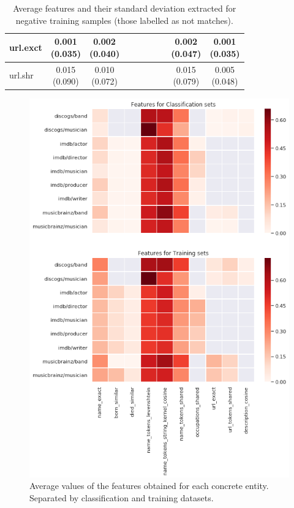 \documentclass[epsfig,a4paper,11pt,titlepage,twoside,openany]{book}
\begin{document}
\begin{table}[h]
\begin{tabular}{l|c|c|c|c|c|c|c|c|c|}
\multicolumn{1}{|l|}{url.exct}                           & \makecell{0.001 \\ (0.035)}  & \makecell{0.002 \\ (0.040)} &              &              &              &              &              & \makecell{0.002 \\ (0.047)}    & \makecell{0.001 \\ (0.035)}   \\ \hline
\multicolumn{1}{|l|}{url.shr}                  & \makecell{0.015 \\ (0.090)}  & \makecell{0.010 \\ (0.072)} &              &              &              &              &              & \makecell{0.015 \\ (0.079)}    & \makecell{0.005 \\ (0.048)}   \\ \hline
\end{tabular}
\caption{Average features and their standard deviation extracted for negative training samples (those labelled as not matches).}
\label{tab:features-viz-average-std-negative}
\end{table}



\begin{figure}[h]
  \centering \includegraphics[width=.8\textwidth]{feature_heatmap_classification_and_training} 
  \caption{Average values of the features obtained for each concrete entity. Separated by classification and training datasets.}
  \label{fig:average-features-classification-training}
\end{figure}
\end{document}
